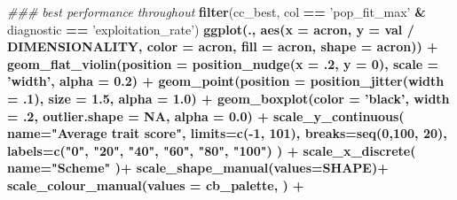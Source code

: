\documentclass[]{book}
\newenvironment{Shaded}{\begin{snugshade}}{\end{snugshade}}
\newcommand{\CommentTok}[1]{\textcolor[rgb]{0.56,0.35,0.01}{\textit{#1}}}
\newcommand{\DataTypeTok}[1]{\textcolor[rgb]{0.13,0.29,0.53}{#1}}
\newcommand{\DecValTok}[1]{\textcolor[rgb]{0.00,0.00,0.81}{#1}}
\newcommand{\FloatTok}[1]{\textcolor[rgb]{0.00,0.00,0.81}{#1}}
\newcommand{\KeywordTok}[1]{\textcolor[rgb]{0.13,0.29,0.53}{\textbf{#1}}}
\newcommand{\NormalTok}[1]{#1}
\newcommand{\OperatorTok}[1]{\textcolor[rgb]{0.81,0.36,0.00}{\textbf{#1}}}
\newcommand{\OtherTok}[1]{\textcolor[rgb]{0.56,0.35,0.01}{#1}}
\newcommand{\StringTok}[1]{\textcolor[rgb]{0.31,0.60,0.02}{#1}}
\begin{document}
\begin{Shaded}
\begin{Highlighting}[]
\CommentTok{### best performance throughout}
\KeywordTok{filter}\NormalTok{(cc_best, col }\OperatorTok{==}\StringTok{ 'pop_fit_max'} \OperatorTok{&}\StringTok{ }\NormalTok{diagnostic }\OperatorTok{==}\StringTok{ 'exploitation_rate'}\NormalTok{) }\OperatorTok{%>%}
\StringTok{  }\KeywordTok{ggplot}\NormalTok{(., }\KeywordTok{aes}\NormalTok{(}\DataTypeTok{x =}\NormalTok{ acron, }\DataTypeTok{y =}\NormalTok{ val }\OperatorTok{/}\StringTok{ }\NormalTok{DIMENSIONALITY, }\DataTypeTok{color =}\NormalTok{ acron, }\DataTypeTok{fill =}\NormalTok{ acron, }\DataTypeTok{shape =}\NormalTok{ acron)) }\OperatorTok{+}
\StringTok{  }\KeywordTok{geom_flat_violin}\NormalTok{(}\DataTypeTok{position =} \KeywordTok{position_nudge}\NormalTok{(}\DataTypeTok{x =} \FloatTok{.2}\NormalTok{, }\DataTypeTok{y =} \DecValTok{0}\NormalTok{), }\DataTypeTok{scale =} \StringTok{'width'}\NormalTok{, }\DataTypeTok{alpha =} \FloatTok{0.2}\NormalTok{) }\OperatorTok{+}
\StringTok{  }\KeywordTok{geom_point}\NormalTok{(}\DataTypeTok{position =} \KeywordTok{position_jitter}\NormalTok{(}\DataTypeTok{width =} \FloatTok{.1}\NormalTok{), }\DataTypeTok{size =} \FloatTok{1.5}\NormalTok{, }\DataTypeTok{alpha =} \FloatTok{1.0}\NormalTok{) }\OperatorTok{+}
\StringTok{  }\KeywordTok{geom_boxplot}\NormalTok{(}\DataTypeTok{color =} \StringTok{'black'}\NormalTok{, }\DataTypeTok{width =} \FloatTok{.2}\NormalTok{, }\DataTypeTok{outlier.shape =} \OtherTok{NA}\NormalTok{, }\DataTypeTok{alpha =} \FloatTok{0.0}\NormalTok{) }\OperatorTok{+}
\StringTok{  }\KeywordTok{scale_y_continuous}\NormalTok{(}
    \DataTypeTok{name=}\StringTok{"Average trait score"}\NormalTok{,}
    \DataTypeTok{limits=}\KeywordTok{c}\NormalTok{(}\OperatorTok{-}\DecValTok{1}\NormalTok{, }\DecValTok{101}\NormalTok{),}
    \DataTypeTok{breaks=}\KeywordTok{seq}\NormalTok{(}\DecValTok{0}\NormalTok{,}\DecValTok{100}\NormalTok{, }\DecValTok{20}\NormalTok{),}
    \DataTypeTok{labels=}\KeywordTok{c}\NormalTok{(}\StringTok{"0"}\NormalTok{, }\StringTok{"20"}\NormalTok{, }\StringTok{"40"}\NormalTok{, }\StringTok{"60"}\NormalTok{, }\StringTok{"80"}\NormalTok{, }\StringTok{"100"}\NormalTok{)}
\NormalTok{  ) }\OperatorTok{+}
\StringTok{  }\KeywordTok{scale_x_discrete}\NormalTok{(}
    \DataTypeTok{name=}\StringTok{"Scheme"}
\NormalTok{  )}\OperatorTok{+}
\StringTok{  }\KeywordTok{scale_shape_manual}\NormalTok{(}\DataTypeTok{values=}\NormalTok{SHAPE)}\OperatorTok{+}
\StringTok{  }\KeywordTok{scale_colour_manual}\NormalTok{(}\DataTypeTok{values =}\NormalTok{ cb_palette, ) }\OperatorTok{+}
}
\end{Highlighting}
\end{Shaded}
\end{document}

